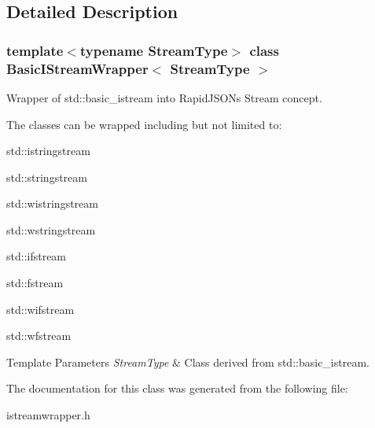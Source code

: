 \subsection{Detailed Description}
\subsubsection*{template$<$typename Stream\+Type$>$\newline
class Basic\+I\+Stream\+Wrapper$<$ Stream\+Type $>$}

Wrapper of {\ttfamily std\+::basic\+\_\+istream} into Rapid\+J\+S\+ON\textquotesingle{}s Stream concept. 

The classes can be wrapped including but not limited to\+:


\begin{DoxyItemize}
\item {\ttfamily std\+::istringstream} 
\item {\ttfamily std\+::stringstream} 
\item {\ttfamily std\+::wistringstream} 
\item {\ttfamily std\+::wstringstream} 
\item {\ttfamily std\+::ifstream} 
\item {\ttfamily std\+::fstream} 
\item {\ttfamily std\+::wifstream} 
\item {\ttfamily std\+::wfstream} 
\end{DoxyItemize}


\begin{DoxyTemplParams}{Template Parameters}
{\em Stream\+Type} & Class derived from {\ttfamily std\+::basic\+\_\+istream}. \\
\hline
\end{DoxyTemplParams}


The documentation for this class was generated from the following file\+:\begin{DoxyCompactItemize}
\item 
istreamwrapper.\+h\end{DoxyCompactItemize}
